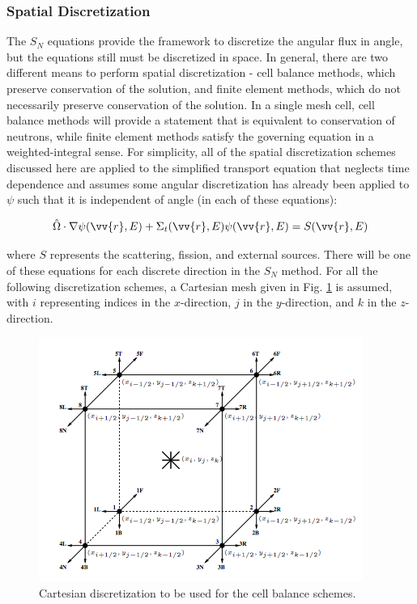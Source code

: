 \documentclass[10pt]{article}
\newcommand{\hO}{\hat{\Omega}}
\begin{document}
\begin{flushleft}
\subsubsection{Spatial Discretization}

The \(S_N\) equations provide the framework to discretize the angular flux in angle, but the equations still must be discretized in space. In general, there are two different means to perform spatial discretization - cell balance methods, which preserve conservation of the solution, and finite element methods, which do not necessarily preserve conservation of the solution. In a single mesh cell, cell balance methods will provide a statement that is equivalent to conservation of neutrons, while finite element methods satisfy the governing equation in a weighted-integral sense. For simplicity, all of the spatial discretization schemes discussed here are applied to the simplified transport equation that neglects time dependence and assumes some angular discretization has already been applied to \(\psi\) such that it is independent of angle (in each of these equations):

\begin{equation}
\label{eq:SimpleTE}
\hO  \cdot\nabla\psi(\vv{r},E)+\Sigma_t({\vv{r},E})\psi(\vv{r},E)=S(\vv{r},E)
\end{equation}

where \(S\) represents the scattering, fission, and external sources. There will be one of these equations for each discrete direction in the \(S_N\) method. For all the following discretization schemes, a Cartesian mesh given in Fig. \ref{fig:CartesianDiscretization} is assumed, with \(i\) representing indices in the \(x\)-direction, \(j\) in the \(y\)-direction, and \(k\) in the \(z\)-direction.

\begin{figure}[H]
\centering
\includegraphics[width=0.6\linewidth]{figures/CartesianDiscretization.jpg}
\caption{Cartesian discretization to be used for the cell balance schemes.}
\label{fig:CartesianDiscretization}
\end{figure}


\end{flushleft}
\end{document}
